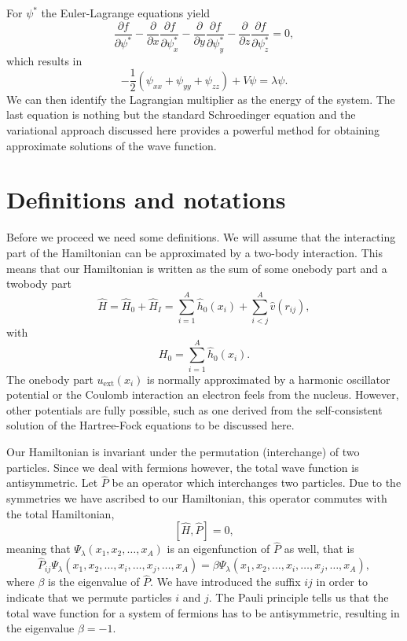\documentclass[graybox,sectrefs,envcountresetchap,open=right]{svmonodo}
\begin{document}
For $\psi^*$ the Euler-Lagrange  equations yield
\[
\frac{\partial f}{\partial \psi^*}- \frac{\partial }{\partial x}\frac{\partial f}{\partial \psi^*_x}-\frac{\partial }{\partial y}\frac{\partial f}{\partial \psi^*_y}-\frac{\partial }{\partial z}\frac{\partial f}{\partial \psi^*_z}=0,
\] 
which results in 
\[
    -\frac{1}{2}(\psi_{xx}+\psi_{yy}+\psi_{zz})+V\psi=\lambda \psi.
\]
We can then identify the  Lagrangian multiplier as the energy of the system. The last equation is 
nothing but the standard 
Schroedinger equation and the variational  approach discussed here provides 
a powerful method for obtaining approximate solutions of the wave function.






\section{Definitions and notations}

Before we proceed we need some definitions.
We will assume that the interacting part of the Hamiltonian
can be approximated by a two-body interaction.
This means that our Hamiltonian is written as the sum of some onebody part and a twobody part
\begin{equation}
    \hat{H} = \hat{H}_0 + \hat{H}_I 
    = \sum_{i=1}^A \hat{h}_0(x_i) + \sum_{i < j}^A \hat{v}(r_{ij}),
\label{Hnuclei}
\end{equation}
with 
\begin{equation}
  H_0=\sum_{i=1}^A \hat{h}_0(x_i).
\label{hinuclei}
\end{equation}
The onebody part $u_{\mathrm{ext}}(x_i)$ is normally approximated by a harmonic oscillator potential or the Coulomb interaction an electron feels from the nucleus. However, other potentials are fully possible, such as 
one derived from the self-consistent solution of the Hartree-Fock equations to be discussed here.




Our Hamiltonian is invariant under the permutation (interchange) of two particles.
Since we deal with fermions however, the total wave function is antisymmetric.
Let $\hat{P}$ be an operator which interchanges two particles.
Due to the symmetries we have ascribed to our Hamiltonian, this operator commutes with the total Hamiltonian,
\[
[\hat{H},\hat{P}] = 0,
 \]
meaning that $\Psi_{\lambda}(x_1, x_2, \dots , x_A)$ is an eigenfunction of 
$\hat{P}$ as well, that is
\[
\hat{P}_{ij}\Psi_{\lambda}(x_1, x_2, \dots,x_i,\dots,x_j,\dots,x_A)=
\beta\Psi_{\lambda}(x_1, x_2, \dots,x_i,\dots,x_j,\dots,x_A),
\]
where $\beta$ is the eigenvalue of $\hat{P}$. We have introduced the suffix $ij$ in order to indicate that we permute particles $i$ and $j$.
The Pauli principle tells us that the total wave function for a system of fermions
has to be antisymmetric, resulting in the eigenvalue $\beta = -1$.   
\end{document}
